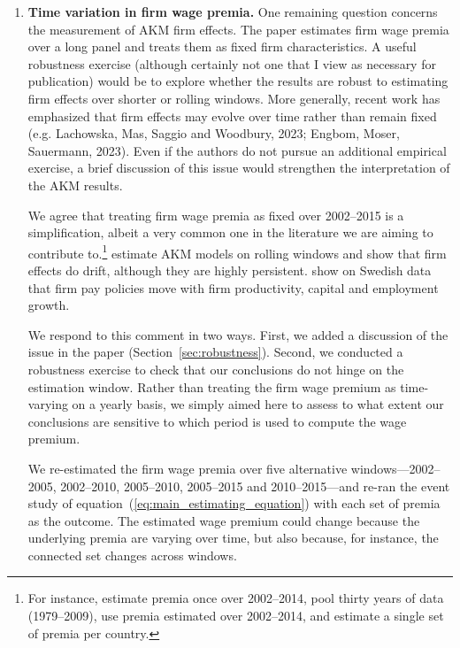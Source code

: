 \documentclass[11pt]{article}
\newcommand{\comment}[1]{\begingroup #1\endgroup}
\newcommand{\answer}[1]{\begingroup\color{navy}#1\endgroup}
\begin{document}
\begin{enumerate}[leftmargin=*]
\item[3.] 
\comment{\textbf{Time variation in firm wage premia.} One remaining question concerns the measurement of AKM firm effects. The paper estimates firm wage premia over a long panel and treats them as fixed firm characteristics. A useful robustness exercise (although certainly not one that I view as necessary for publication) would be to explore whether the results are robust to estimating firm effects over shorter or rolling windows. More generally, recent work has emphasized that firm effects may evolve over time rather than remain fixed (e.g. Lachowska, Mas, Saggio and Woodbury, 2023; Engbom, Moser, Sauermann, 2023). Even if the authors do not pursue an additional empirical exercise, a brief discussion of this issue would strengthen the interpretation of the AKM results.
}\par

\answer{We agree that treating firm wage premia as fixed over 2002--2015 is a simplification, albeit a very common one in the literature we are aiming to contribute to.\footnote{For instance, \citet{Lachowska2020} estimate premia once over 2002--2014, \citet{Schmieder2020} pool thirty years of data (1979--2009), \citet{fackler2017explaining} use premia estimated over 2002--2014, and \citet{bertheau_etal_2023} estimate a single set of premia per country.} \citet{lachowska2023drift} estimate AKM models on rolling windows and show that firm effects do drift, although they are highly persistent. \citet{engbom2023firmpay} show on Swedish data that firm pay policies move with firm productivity, capital and employment growth. %

We respond to this comment in two ways. First, we added a discussion of the issue in the paper (Section~\ref{sec:robustness}). Second, we conducted a robustness exercise to check that our conclusions do not hinge on the estimation window.
Rather than treating the firm wage premium as time-varying on a yearly basis, we simply aimed here to assess to what extent our conclusions are sensitive to which period is used to compute the wage premium. 

We re-estimated the firm wage premia over five alternative windows---2002--2005, 2002--2010, 2005--2010, 2005--2015 and 2010--2015---and re-ran the event study of equation~(\ref{eq:main_estimating_equation}) with each set of premia as the outcome. The estimated wage premium could change because the underlying premia are varying over time, but also because, for instance, the connected set changes across windows. 

}
\end{enumerate}
\end{document}
